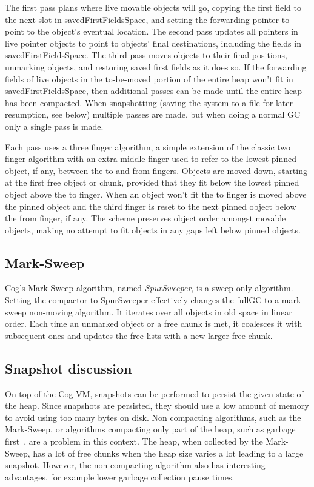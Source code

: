 \documentclass[10pt, sigplan]{acmart}
\begin{document}
The first pass plans where live movable objects will go, copying the first field to the next slot in savedFirstFieldsSpace, and setting the forwarding pointer to point to the object's eventual location. The second pass updates all pointers in live pointer objects to point to objects' final destinations, including the fields in savedFirstFieldsSpace. The third pass moves objects to their final positions, unmarking objects, and restoring saved first fields as it does so. If the forwarding fields of live objects in the to-be-moved portion of the entire heap won't fit in savedFirstFieldsSpace, then additional passes can be made until the entire heap has been compacted.  When snapshotting (saving the system to a file for later resumption, see below) multiple passes are made, but when doing a normal GC only a single pass is made.

Each pass uses a three finger algorithm, a simple extension of the classic two finger algorithm with an extra middle finger used to refer to the lowest pinned object, if any, between the to and from fingers.  Objects are moved down, starting at the first free object or chunk, provided that they fit below the lowest pinned object above the to finger.  When an object won't fit the to finger is moved above the pinned object and the third finger is reset to the next pinned object below the from finger, if any.  The scheme preserves object order amongst movable objects, making no attempt to fit objects in any gaps left below pinned objects.

\subsection{Mark-Sweep} \label{sec:refms}

Cog's Mark-Sweep algorithm, named \emph{SpurSweeper}, is a sweep-only algorithm.  Setting the compactor to SpurSweeper effectively changes the fullGC to a mark-sweep non-moving algorithm. It iterates over all objects in old space in linear order. Each time an unmarked object or a free chunk is met, it coalesces it with subsequent ones and updates the free lists with a new larger free chunk. 

\subsection{Snapshot discussion}

On top of the Cog VM, snapshots can be performed to persist the given state of the heap. Since snapshots are persisted, they should use a low amount of memory to avoid using too many bytes on disk. Non compacting algorithms, such as the Mark-Sweep, or algorithms compacting only part of the heap, such as garbage first~\cite{G1}, are a problem in this context. The heap, when collected by the Mark-Sweep, has a lot of free chunks when the heap size varies a lot leading to a large snapshot. However, the non compacting algorithm also has interesting advantages, for  example lower garbage collection pause times. 
\end{document}
